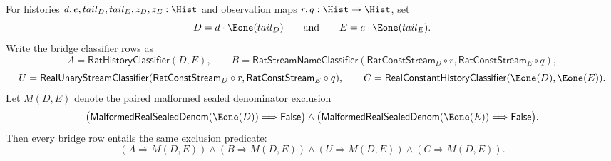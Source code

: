\begin{theorem}
\label{thm:real-constant-appended-tail-bridge-malformed-sealed-denominator-exclusion}
For histories $d,e,tail_D,tail_E,z_D,z_E:\Hist$ and observation maps
$r,q:\Hist\to\Hist$, set
$$
D=d\cdot\Eone(tail_D)
\qquad\text{and}\qquad
E=e\cdot\Eone(tail_E).
$$
Write the bridge classifier rows as
$$
A=\mathsf{RatHistoryClassifier}(D,E),
\qquad
B=\mathsf{RatStreamNameClassifier}(\mathsf{RatConstStream}_D\circ r,
\mathsf{RatConstStream}_E\circ q),
$$
$$
U=\mathsf{RealUnaryStreamClassifier}(\mathsf{RatConstStream}_D\circ r,
\mathsf{RatConstStream}_E\circ q),
\qquad
C=\mathsf{RealConstantHistoryClassifier}(\Eone(D),\Eone(E)).
$$
Let $M(D,E)$ denote the paired malformed sealed denominator exclusion
$$
\bigl(\mathsf{MalformedRealSealedDenom}(\Eone(D))
\Longrightarrow\mathsf{False}\bigr)
\land
\bigl(\mathsf{MalformedRealSealedDenom}(\Eone(E))
\Longrightarrow\mathsf{False}\bigr).
$$
Then every bridge row entails the same exclusion predicate:
$$
(A\Longrightarrow M(D,E))\land
(B\Longrightarrow M(D,E))\land
(U\Longrightarrow M(D,E))\land
(C\Longrightarrow M(D,E)).
$$
\end{theorem}
